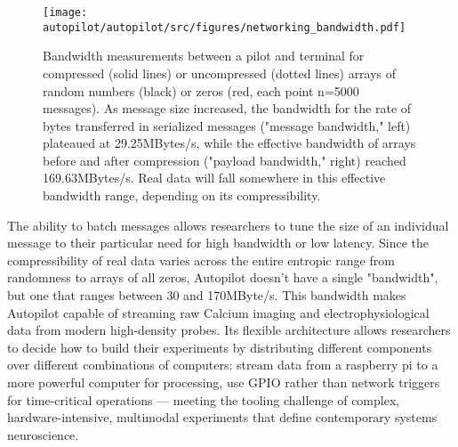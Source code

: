 \begin{figure}[t!]
\texttt{[image: autopilot/autopilot/src/figures/networking\_bandwidth.pdf]}
\caption{Bandwidth measurements between a pilot and terminal for compressed (solid lines) or uncompressed (dotted lines) arrays of random numbers (black) or zeros (red, each point n=5000 messages). As message size increased, the bandwidth for the rate of bytes transferred in serialized messages ("message bandwidth," left) plateaued at 29.25MBytes/s, while the effective bandwidth of arrays before and after compression ("payload bandwidth," right) reached 169.63MBytes/s. Real data will fall somewhere in this effective bandwidth range, depending on its compressibility.}
\label{fig:bandwidth}
\end{figure}

The ability to batch messages allows researchers to tune the size of an individual message to their particular need for high bandwidth or low latency. Since the compressibility of real data varies across the entire entropic range from randomness to arrays of all zeros, Autopilot doesn't have a single "bandwidth", but one that ranges between 30 and 170MByte/s. This bandwidth makes Autopilot capable of streaming raw Calcium imaging and electrophysiological data from modern high-density probes. Its flexible architecture allows researchers to decide how to build their experiments by distributing different components over different combinations of computers: stream data from a raspberry pi to a more powerful computer for processing, use GPIO rather than network triggers for time-critical operations --- meeting the tooling challenge of complex, hardware-intensive, multimodal experiments that define contemporary systems neuroscience.